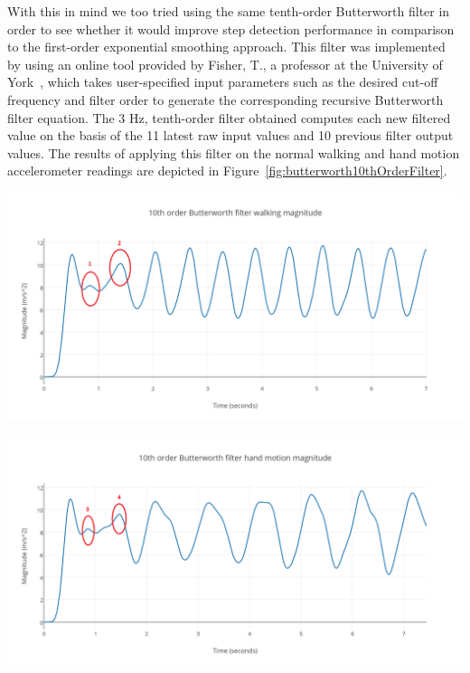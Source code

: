 \documentclass[12pt,a4paper,notitlepage]{report}
\begin{document}
With this in mind we too tried using the same tenth-order Butterworth filter in order to see whether it would improve step detection performance in comparison to the first-order exponential smoothing approach. This filter was implemented by using an online tool provided by Fisher, T., a professor at the University of York~\cite{filterTool}, which takes user-specified input parameters such as the desired cut-off frequency and filter order to generate the corresponding recursive Butterworth filter equation. The 3 Hz, tenth-order filter obtained computes each new filtered value on the basis of the 11 latest raw input values and 10 previous filter output values. The results of applying this filter on the normal walking and hand motion accelerometer readings are depicted in Figure~\ref{fig:butterworth10thOrderFilter}. 
\begin{center}
  \begin{minipage}[b]{0.5\textwidth}
    \includegraphics[scale=0.2]{images/butterworth10thOrderFilterWalkingMagnitude.png}
  \end{minipage}%
  \begin{minipage}[b]{0.5\textwidth}
    \includegraphics[scale=0.2]{images/butterworth10thOrderFilterHandMotionMagnitude.png}
\end{minipage}
\label{fig:butterworth10thOrderFilter}
\end{center}
\end{document}
